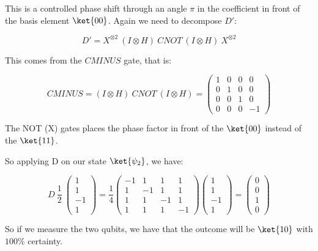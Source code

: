 This is a controlled phase shift through an angle $\pi$ in the coefficient in front of the basis element $\ket{00}$. Again we need to decompose $D'$:

\begin{equation}
    D' = X^{\otimes2} \ (I \otimes H) \ CNOT \ (I \otimes H) \ X^{\otimes2}
\end{equation}

This comes from the $CMINUS$ gate, that is: 

\begin{equation}
    CMINUS = (I \otimes H) \ CNOT \ (I \otimes H) = \begin{pmatrix}
    1 &  0  & 0 & 0 \\
    0 & 1  & 0 & 0 \\
    0 &  0 & 1 & 0 \\
    0 &  0 & 0 & -1
    \end{pmatrix}
\end{equation}

The NOT (X) gates places the phase factor in front of the $\ket{00}$ instead of the $\ket{11}$.

So applying D on our state $\ket{\psi_2}$, we have:

\begin{equation}
    D \ \frac{1}{2} \ \begin{pmatrix}
    1 \\
    1 \\ 
    -1 \\
    1
    \end{pmatrix} =  \frac{1}{4} \begin{pmatrix}
    -1 & 1 & 1 & 1 \\
    1 & -1 & 1 & 1 \\
    1 & 1 & -1 & 1 \\
    1 & 1 & 1 & -1
    \end{pmatrix} \begin{pmatrix}
    1 \\
    1 \\ 
    -1 \\
    1
    \end{pmatrix}
    = \begin{pmatrix}
    0 \\
    0 \\ 
    1 \\
    0
    \end{pmatrix}
\end{equation}

So if we measure the two qubits, we have that the outcome will be $\ket{10}$ with $100 \%$ certainty. 
 
